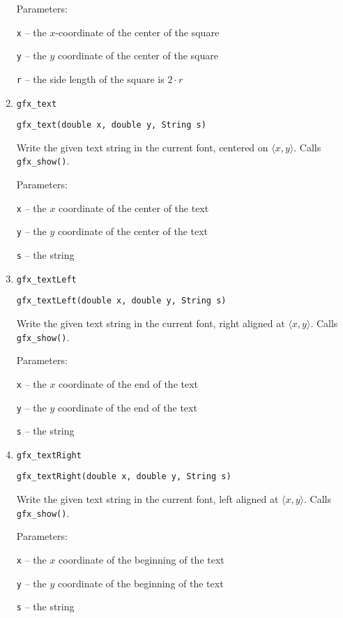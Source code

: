 \begin{enumerate}
      Parameters:

      \texttt{x} -- the $x$-coordinate of the center of the square 

      \texttt{y} -- the $y$ coordinate of the center of the square 

      \texttt{r} -- the side length of the square is $2 \cdot r$
\item \texttt{gfx\_text}

      \texttt{gfx\_text(double x, double y, String s)}

      Write the given text string in the current font, centered on $\langle x, y \rangle$. 
      Calls \texttt{gfx\_show()}.
      
      Parameters:

      \texttt{x} -- the $x$ coordinate of the center of the text 

      \texttt{y} -- the $y$ coordinate of the center of the text 

      \texttt{s} -- the string
\item \texttt{gfx\_textLeft}

      \texttt{gfx\_textLeft(double x, double y, String s)}

      Write the given text string in the current font, right aligned at $\langle x, y \rangle$. 
      Calls \texttt{gfx\_show()}.

      Parameters:

      \texttt{x} -- the $x$ coordinate of the end of the text 

      \texttt{y} -- the $y$ coordinate of the end of the text 

      \texttt{s} -- the string
\item \texttt{gfx\_textRight}

      \texttt{gfx\_textRight(double x, double y, String s)}

      Write the given text string in the current font, left aligned at $\langle x, y \rangle$. 
      Calls \texttt{gfx\_show()}.

      Parameters:

      \texttt{x} -- the $x$ coordinate of the beginning of the text 

      \texttt{y} -- the $y$ coordinate of the beginning of the text 

      \texttt{s} -- the string
\end{enumerate}

